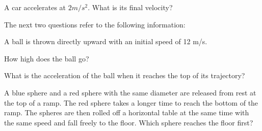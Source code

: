 \documentclass[10pt]{examdesign}
\begin{document}
\begin{multiplechoice} [title={Multiple Choice},
	rearrange=yes]
\begin{question}
	A car accelerates at $2 m/s^2$.  What is its final velocity?
\end{question}

\begin{block}
The next two questions refer to the following information:

	A ball is thrown directly upward with an initial speed of 12 m/s. 
	
\begin{question}
  How high does the ball go?
\end{question}

\begin{question}
What is the acceleration of the ball when it reaches the top of its trajectory?

	\end{question}



\end{block}

\begin{question}
A blue sphere and a red sphere with the same diameter are released from rest at the top of a ramp. The red sphere takes a longer time to reach the bottom of the ramp. The spheres are then rolled off a horizontal table at the same time with the same speed and fall freely to the floor. Which sphere reaches the floor first? 
\end{question}





\end{multiplechoice}
\end{document}
